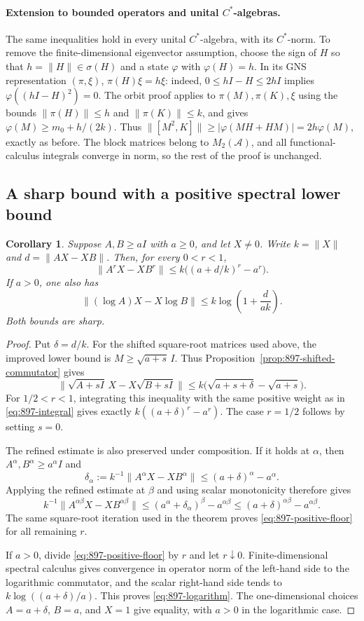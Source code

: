 \documentclass[11pt,a4paper]{article}
\newtheorem{corollary}[theorem]{Corollary}
\theoremstyle{remark}
\begin{document}
\paragraph{Extension to bounded operators and unital $C^*$-algebras.}
The same inequalities hold in every unital $C^*$-algebra, with its
$C^*$-norm. To remove the finite-dimensional eigenvector assumption,
choose the sign of $H$ so that $h=\|H\|\in\sigma(H)$ and a state
$\varphi$ with $\varphi(H)=h$. In its GNS representation $(\pi,\xi)$,
$\pi(H)\xi=h\xi$: indeed, $0\le hI-H\le2hI$ implies
$\varphi((hI-H)^2)=0$. The orbit proof applies to $\pi(M),\pi(K),\xi$
using the bounds $\|\pi(H)\|\le h$ and $\|\pi(K)\|\le k$, and gives
$\varphi(M)\ge m_0+h/(2k)$. Thus
$\|[M^2,K]\|\ge|\varphi(MH+HM)|=2h\varphi(M)$, exactly as before.
The block matrices belong to $M_2(\mathcal A)$, and all functional-calculus
integrals converge in norm, so the rest of the proof is unchanged.

\subsection{A sharp bound with a positive spectral lower bound}

\begin{corollary}\label{cor:897-lower-bound}
Suppose $A,B\ge aI$ with $a\ge0$, and let $X\ne0$. Write
$k=\|X\|$ and $d=\|AX-XB\|$. Then, for every $0<r<1$,
\[
 \|A^rX-XB^r\|
 \le k\bigl((a+d/k)^r-a^r\bigr).
 \tag{897.10}\label{eq:897-positive-floor}
\]
If $a>0$, one also has
\[
 \|(\log A)X-X\log B\|
 \le k\log\left(1+\frac{d}{ak}\right).
 \tag{897.11}\label{eq:897-logarithm}
\]
Both bounds are sharp.
\end{corollary}
\begin{proof}
Put $\delta=d/k$. For the shifted square-root matrices used above, the
improved lower bound is $M\ge\sqrt{a+s}\,I$. Thus
Proposition~\ref{prop:897-shifted-commutator} gives
\[
 \|\sqrt{A+sI}\,X-X\sqrt{B+sI}\|
 \le k\bigl(\sqrt{a+s+\delta}-\sqrt{a+s}\bigr).
\]
For $1/2<r<1$, integrating this inequality with the same positive weight
as in \eqref{eq:897-integral} gives exactly
$k((a+\delta)^r-a^r)$. The case $r=1/2$ follows by setting $s=0$.

The refined estimate is also preserved under composition. If it holds at
$\alpha$, then $A^\alpha,B^\alpha\ge a^\alpha I$ and
\[
 \delta_\alpha:=k^{-1}\|A^\alpha X-XB^\alpha\|
 \le(a+\delta)^\alpha-a^\alpha.
\]
Applying the refined estimate at $\beta$ and using scalar monotonicity
therefore gives
\[
 k^{-1}\|A^{\alpha\beta}X-XB^{\alpha\beta}\|
 \le(a^\alpha+\delta_\alpha)^\beta-a^{\alpha\beta}
 \le(a+\delta)^{\alpha\beta}-a^{\alpha\beta}.
\]
The same square-root iteration used in the theorem proves
\eqref{eq:897-positive-floor} for all remaining $r$.

If $a>0$, divide \eqref{eq:897-positive-floor} by $r$ and let $r\downarrow0$.
Finite-dimensional spectral calculus gives convergence in operator norm
of the left-hand side to the logarithmic commutator, and the scalar
right-hand side tends to $k\log((a+\delta)/a)$. This proves
\eqref{eq:897-logarithm}. The one-dimensional choices
$A=a+\delta$, $B=a$, and $X=1$ give equality, with $a>0$ in the logarithmic
case.
\end{proof}
\end{document}
